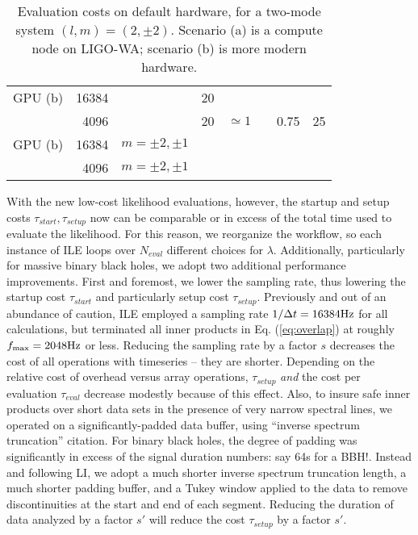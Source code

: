 \documentclass[twocolumn,prd,nofootinbib]{revtex4}
\newcommand\unit[1]{{\rm #1}}
\newcommand\ILE{ILE}
\newcommand\editremark[1]{{\color{red} #1}}
\begin{document}
\begin{table}
\begin{tabular}{lrr|cccc|r}
GPU (b) & 16384 & & 20 \\
       & 4096 & & 20 & $\simeq 1$ &   & 0.75  & 25\\ \hline
GPU (b) & 16384 & $m=\pm 2, \pm 1$ &  \\
       & 4096 & $m=\pm 2, \pm 1$ \\
\end{tabular}
\caption{\label{tab:CostBreakdown}Evaluation costs on default hardware, for a two-mode system $(l,m)=(2,\pm 2)$.  Scenario (a) is a compute node on LIGO-WA; scenario (b) is more modern hardware. }
\end{table}


With the new low-cost likelihood evaluations, however, the startup and setup costs  $\tau_{start},\tau_{setup}$ now can be
comparable or in excess of the total time used to evaluate the likelihood.   For this reason, we reorganize the workflow, so each
instance of ILE loops over
$N_{eval}$ different choices for $\lambda$. 
%
Additionally, particularly for massive binary black holes, we adopt two additional performance improvements.  First and
foremost, we lower the sampling rate, thus lowering the startup cost $\tau_{start}$ and particularly setup cost
$\tau_{setup}$.  Previously and out of an abundance of caution, \ILE{} employed a sampling rate $1/\Delta t = 16384
\unit{Hz}$ for all calculations, but terminated all inner products in Eq. (\ref{eq:overlap}) at roughly $f_{\rm
  max}=2048\unit{Hz}$ or less.   Reducing the sampling rate by a factor $s$ decreases the  cost of all operations with
timeseries -- they are shorter.  Depending on the relative cost of overhead versus array operations,  $\tau_{setup}$
\emph{and} the cost per evaluation $\tau_{eval}$ decrease modestly because of this effect.  
Also, to insure safe inner products over short data sets in the presence of very narrow spectral lines, we operated on a
significantly-padded data buffer,
using 
``inverse spectrum truncation'' \editremark{citation}.  For binary black holes, the degree of padding was significantly
in excess of the signal duration \editremark{numbers: say 64s for a BBH!}.  
Instead and following LI, we adopt a much shorter inverse spectrum truncation length, a much shorter padding buffer, and
a Tukey window applied to the data to remove discontinuities at the start and end of each segment.   
Reducing the duration of data analyzed by a factor $s'$ will reduce the cost $\tau_{setup}$ by a factor $s'$.  
\end{document}
